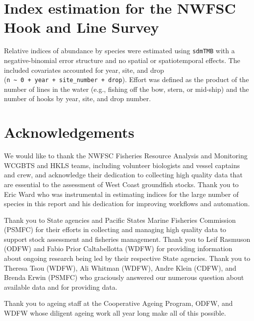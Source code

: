 \documentclass[
  english,
]{article}
\begin{document}
\section{Index estimation for the NWFSC Hook and Line
Survey}\label{hkl-index-settings}

Relative indices of abundance by species were estimated using
\texttt{sdmTMB} with a negative-binomial error structure and no spatial
or spatiotemporal effects. The included covariates accounted for year,
site, and drop
(\texttt{n\ \textasciitilde{}\ 0\ +\ year\ +\ site\_number\ +\ drop}).
Effort was defined as the product of the number of lines in the water
(e.g., fishing off the bow, stern, or mid-ship) and the number of hooks
by year, site, and drop number.

\newpage

\section{Acknowledgements}\label{acknowledgements}

We would like to thank the NWFSC Fisheries Resource Analysis and
Monitoring WCGBTS and HKLS teams, including volunteer biologists and
vessel captains and crew, and acknowledge their dedication to collecting
high quality data that are essential to the assessment of West Coast
groundfish stocks. Thank you to Eric Ward who was instrumental in
estimating indices for the large number of species in this report and
his dedication for improving workflows and automation.

Thank you to State agencies and Pacific States Marine Fisheries
Commission (PSMFC) for their efforts in collecting and managing high
quality data to support stock assessment and fisheries management. Thank
you to Leif Rasmuson (ODFW) and Fabio Prior Caltabellotta (WDFW) for
providing information about ongoing research being led by their
respective State agencies. Thank you to Theresa Tsou (WDFW), Ali Whitman
(WDFW), Andre Klein (CDFW), and Brenda Erwin (PSMFC) who graciously
answered our numerous question about available data and for providing
data.

Thank you to ageing staff at the Cooperative Ageing Program, ODFW, and
WDFW whose diligent ageing work all year long make all of this possible.
\end{document}
